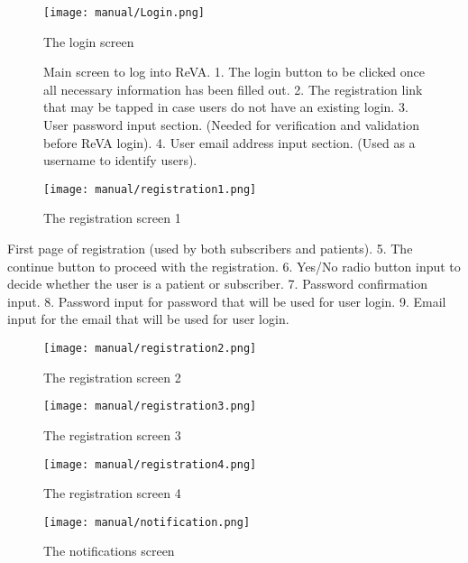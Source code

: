 \begin{figure}[ht!]
\centering
\begin{minipage}{.5\textwidth}
  \centering
  \texttt{[image: manual/Login.png]}
  \caption{\label{fig:vitals}The login screen}
Main screen to log into ReVA. 
   1. The login button to be clicked once all necessary information has been filled out. 
   2. The registration link that may be tapped in case users do not have an existing login. 
   3. User password input section. (Needed for verification and validation before ReVA login). 
   4. User email address input section. (Used as a username to identify users). 
\end{minipage}%
\begin{minipage}{.5\textwidth}
  \centering
  \texttt{[image: manual/registration1.png]}
  \caption{\label{fig:statistic}The registration screen 1}
\end{minipage}
\end{figure}
First page of registration (used by both subscribers and patients). 
  5. The continue button to proceed with the registration. 
  6. Yes/No radio button input to decide whether the user is a patient or subscriber. 
  7. Password confirmation input. 
  8. Password input for password that will be used for user login. 
  9. Email input for the email that will be used for user login. 

\begin{figure}[ht!]
\centering
\begin{minipage}{.5\textwidth}
  \centering
  \texttt{[image: manual/registration2.png]}
  \caption{\label{fig:vitals}The registration screen 2}

\end{minipage}%
\begin{minipage}{.5\textwidth}
  \centering
  \texttt{[image: manual/registration3.png]}
  \caption{\label{fig:statistic}The registration screen 3}
\end{minipage}
\end{figure}

\begin{figure}[ht!]
\centering
\begin{minipage}{.5\textwidth}
  \centering
  \texttt{[image: manual/registration4.png]}
  \caption{\label{fig:vitals}The registration screen 4}

\end{minipage}%
\begin{minipage}{.5\textwidth}
  \centering
  \texttt{[image: manual/notification.png]}
  \caption{\label{fig:statistic}The notifications screen}
\end{minipage}
\end{figure}


